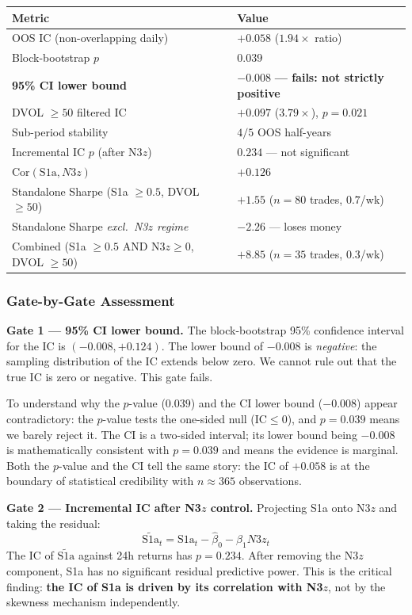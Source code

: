 \documentclass[12pt, a4paper]{article}
\theoremstyle{plain}
\theoremstyle{definition}
\newcommand{\IC}{\mathrm{IC}}
\newcommand{\Cor}{\mathrm{Cor}}
\begin{document}
\begin{center}
\begin{tabular}{ll}
\toprule
Metric & Value \\
\midrule
OOS IC (non-overlapping daily) & $+0.058$ ($1.94\times$ ratio) \\
Block-bootstrap $p$ & $0.039$ \\
\textbf{95\% CI lower bound} & $\mathbf{-0.008}$ \textbf{--- fails: not strictly positive} \\
DVOL $\geq 50$ filtered IC & $+0.097$ ($3.79\times$), $p = 0.021$ \\
Sub-period stability & $4/5$ OOS half-years \\
Incremental IC $p$ (after N3$z$) & $0.234$ --- not significant \\
$\Cor(\text{S1a}, N3z)$ & $+0.126$ \\
\midrule
Standalone Sharpe (S1a $\geq 0.5$, DVOL $\geq 50$) & $+1.55$ ($n = 80$ trades, $0.7$/wk) \\
Standalone Sharpe \emph{excl.\ N3$z$ regime} & $-2.26$ --- loses money \\
\midrule
Combined (S1a $\geq 0.5$ AND N3$z \geq 0$, DVOL $\geq 50$) & $+8.85$ ($n = 35$ trades, $0.3$/wk) \\
\bottomrule
\end{tabular}
\end{center}

\subsubsection{Gate-by-Gate Assessment}

\textbf{Gate 1 --- 95\% CI lower bound.}
The block-bootstrap 95\% confidence interval for the IC is $(-0.008, +0.124)$.
The lower bound of $-0.008$ is \emph{negative}: the sampling distribution
of the IC extends below zero.  We cannot rule out that the true IC is
zero or negative.  This gate fails.

To understand why the $p$-value ($0.039$) and the CI lower bound
($-0.008$) appear contradictory: the $p$-value tests the one-sided
null ($\IC \leq 0$), and $p = 0.039$ means we barely reject it.
The CI is a two-sided interval; its lower bound being $-0.008$ is
mathematically consistent with $p = 0.039$ and means the evidence
is marginal.  Both the $p$-value and the CI tell the same story:
the IC of $+0.058$ is at the boundary of statistical credibility
with $n \approx 365$ observations.

\textbf{Gate 2 --- Incremental IC after N3$z$ control.}
Projecting S1a onto N3$z$ and taking the residual:
\[
  \tilde{\text{S1a}}_t = \text{S1a}_t - \hat{\beta}_0 - \hat{\beta}_1 N3z_t
\]
The IC of $\tilde{\text{S1a}}$ against 24h returns has $p = 0.234$.
After removing the N3$z$ component, S1a has no significant
residual predictive power.  This is the critical finding: \textbf{the
IC of S1a is driven by its correlation with N3$z$}, not by the skewness
mechanism independently.
\end{document}
